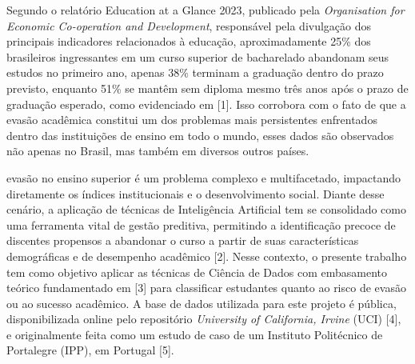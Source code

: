 Segundo o relatório Education at a Glance 2023, publicado pela \textit{Organisation for Economic Co-operation and Development}, responsável pela divulgação dos principais indicadores relacionados à educação, aproximadamente 25\% dos brasileiros ingressantes em um curso superior de bacharelado abandonam seus estudos no primeiro ano, apenas 38\% terminam a graduação dentro do prazo previsto, enquanto 51\% se mantêm sem diploma mesmo três anos após o prazo de graduação esperado, como evidenciado em [1]. Isso corrobora com o fato de que a evasão acadêmica constitui um dos problemas mais persistentes enfrentados dentro das instituições de ensino em todo o mundo, esses dados são observados não apenas no Brasil, mas também em diversos outros países.

 evasão no ensino superior é um problema complexo e multifacetado, impactando diretamente os índices institucionais e o desenvolvimento social. Diante desse cenário, a aplicação de técnicas de Inteligência Artificial tem se consolidado como uma ferramenta vital de gestão preditiva, permitindo a identificação precoce de discentes propensos a abandonar o curso a partir de suas características demográficas e de desempenho acadêmico [2]. Nesse contexto, o presente trabalho tem como objetivo aplicar as técnicas de Ciência de Dados com embasamento teórico fundamentado em [3] para classificar estudantes quanto ao risco de evasão ou ao sucesso acadêmico. A base de dados utilizada para este projeto é pública, disponibilizada online pelo repositório \textit{University of California, Irvine} (UCI) [4], e originalmente feita como um estudo de caso de um Instituto Politécnico de Portalegre (IPP), em Portugal [5].
